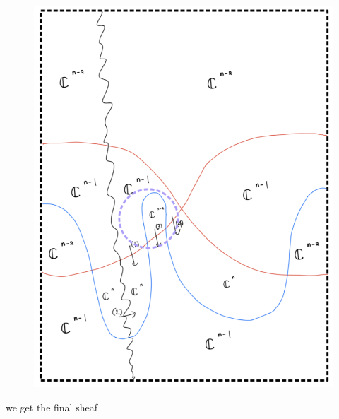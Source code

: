 \begin{enumerate}[label=(Step \arabic*)]
\begin{figure}[H]
    \centering
    \includegraphics[scale = 0.85]{diagrams/cobord'8/8.png}
    \caption{}
    \label{fig:your-label}
\end{figure}
\pagebreak
we get the final sheaf


\end{enumerate}
